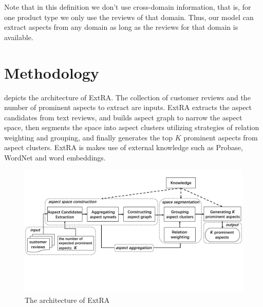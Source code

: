 Note that in this definition we don't use cross-domain information, 
that is, for one product type we only use the reviews of that domain.
Thus, our model can extract aspects from any domain as long as the reviews for that domain is available.

%
%


%
%
%
%

\section{Methodology}
 depicts the architecture of ExtRA.
The collection of customer reviews and the
number of prominent aspects to extract are inputs.
ExtRA extracts the aspect candidates from text reviews,
and builds aspect graph to narrow the aspect space, 
then segments the space into aspect clusters 
utilizing strategies of relation weighting and grouping,
and finally generates the top $K$ prominent aspects from aspect clusters.
ExtRA is makes use of external knowledge such as Probase, WordNet and word embeddings.

\begin{figure}[th!]
	\centering
	\includegraphics[width=0.95\columnwidth]{figures/cflow}
	\caption{The architecture of ExtRA}
	\label{fig:flow}
\end{figure}

